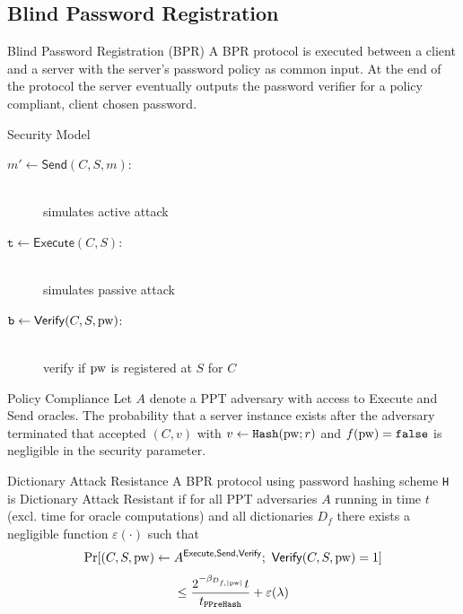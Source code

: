 \documentclass[notes,xcolor=dvipsnames]{beamer}
\begin{document}
\subsection[BPR]{Blind Password Registration}

\begin{frame}{Blind Password Registration (BPR)}
  A BPR protocol is executed between a client and a server with the server's password policy as common input.
  At the end of the protocol the server eventually outputs the password verifier for a policy compliant, client chosen password.
\end{frame}

\begin{frame}{Security Model}

  \begin{description}
    \item[$m'\gets\mathsf{Send}(C,S,m)$:] \hfill \\ simulates active attack
    \item[$\mathtt{t}\gets\mathsf{Execute}(C,S)$:] \hfill \\ simulates passive attack
    \item[$\mathtt{b}\gets\mathsf{Verify}(C,S,\mathrm{pw})$:] \hfill \\ verify if $\mathrm{pw}$ is registered at $S$ for $C$
  \end{description}

\end{frame}

\begin{frame}{Policy Compliance}
  Let $A$ denote a PPT adversary with access to Execute and Send oracles. The probability that a server instance exists after the adversary terminated that accepted $(C, v)$ with $v \gets \mathtt{Hash}(\mathrm{pw}; r)$ and $f(\mathrm{pw})=\mathtt{false}$ is negligible in the security parameter.
\end{frame}

\begin{frame}{Dictionary Attack Resistance}
  A BPR protocol using password hashing scheme \texttt{H} is Dictionary Attack Resistant if for all PPT adversaries $A$ running in time $t$ (excl. time for oracle computations) and all dictionaries $D_f$ there exists a negligible function $\varepsilon(\cdot)$ such that
  \[
    \Pr[(C, S, \mathrm{pw}) \gets A^{\mathsf{Execute},\mathsf{Send},\mathsf{Verify}}; ~ \mathsf{Verify}(C, S, \mathrm{pw})=1]
  \]
  \[
    \leq \frac{2^{-\beta_{D_{f,|\mathrm{pw}|}}}t}{t_{\mathtt{PPreHash}}} + \varepsilon(\lambda)
  \]
\end{frame}
\end{document}
